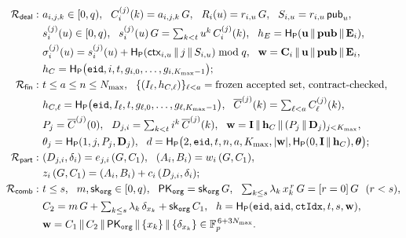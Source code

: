 {\small\setlength{\jot}{1pt}
\begin{align*}
\Rel{deal}:\ & a_{i,j,k}\in[0,q),\ \ C_i^{(j)}(k)=a_{i,j,k}\,G,\ \ R_i(u)=r_{i,u}\,G,\ \ S_{i,u}=r_{i,u}\,\mathsf{pub}_u,\\
& s_i^{(j)}(u)\in[0,q),\ \ s_i^{(j)}(u)\,G=\textstyle\sum_{k<t}u^k\,C_i^{(j)}(k),\ \ h_E=\HP(\vct{u}\,\|\,\vct{pub}\,\|\,\vct{E}_i),\\
& \sigma_i^{(j)}(u)=s_i^{(j)}(u)+\HP(\mathsf{ctx}_{i,u}\,\|\,j\,\|\,S_{i,u}) \bmod q,\ \ \vct{w}=\vct{C}_i\,\|\,\vct{u}\,\|\,\vct{pub}\,\|\,\vct{E}_i,\\
& h_C=\HP\big(\mathtt{eid},i,t,g_{i,0},\dots,g_{i,\Kmax-1}\big);\\
\Rel{fin}:\ & t\le a\le n\le\Nmax,\ \ \{(I_\ell,h_{C,\ell})\}_{\ell<a}=\text{frozen accepted set, contract-checked},\\
& h_{C,\ell}=\HP\big(\mathtt{eid},I_\ell,t,g_{\ell,0},\dots,g_{\ell,\Kmax-1}\big),\ \ \Cbar^{(j)}(k)=\textstyle\sum_{\ell<a}C_\ell^{(j)}(k),\\
& P_j=\Cbar^{(j)}(0),\ \ D_{j,i}=\textstyle\sum_{k<t}i^k\,\Cbar^{(j)}(k),\ \ \vct{w}=\vct{I}\,\|\,\vct{h}_C\,\|\,(P_j\,\|\,\vct{D}_j)_{j<\Kmax},\\
& \theta_j=\HP(1,j,P_j,\vct{D}_j),\ \ d=\HP\big(2,\mathtt{eid},t,n,a,\Kmax,|\vct{w}|,\HP(0,\vct{I}\,\|\,\vct{h}_C),\bm{\theta}\big);\\
\Rel{part}:\ & (D_{j,i},\delta_i)=e_{j,i}\,(G,C_1),\ \ (A_i,B_i)=w_i\,(G,C_1),\\
& z_i\,(G,C_1)=(A_i,B_i)+c_i\,(D_{j,i},\delta_i);\\
\Rel{comb}:\ & t\le s,\ \ m,\mathsf{sk}_{\mathtt{org}}\in[0,q),\ \ \mathsf{PK}_{\mathtt{org}}=\mathsf{sk}_{\mathtt{org}}\,G,\ \ \textstyle\sum_{k\le s}\lambda_k\,x_k^{\,r}\,G=[r=0]\,G\ \ (r<s),\\
& C_2=m\,G+\textstyle\sum_{k\le s}\lambda_k\,\delta_{x_k}+\mathsf{sk}_{\mathtt{org}}\,C_1,\ \ h=\HP(\mathtt{eid},\mathtt{aid},\mathtt{ctIdx},t,s,\vct{w}),\\
& \vct{w}=C_1\,\|\,C_2\,\|\,\mathsf{PK}_{\mathtt{org}}\,\|\,\{x_k\}\,\|\,\{\delta_{x_k}\}\in\FB_p^{\,6+3\Nmax}.
\end{align*}}%

